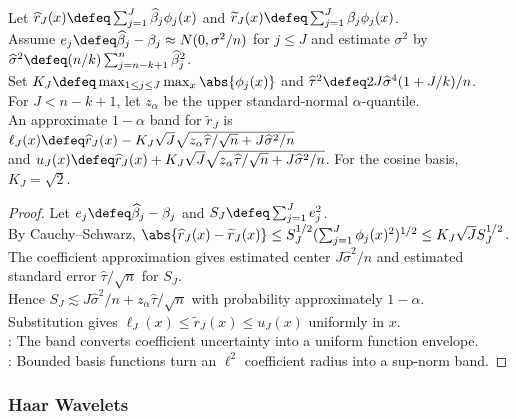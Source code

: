 \begin{theorem} \label{thm:orthogonal-regression-confidence-band} \\
Let $\widehat r_J(x)\defeq\sum_{j=1}^{J}\widehat\beta_j\phi_j(x)$ and $\widetilde r_J(x)\defeq\sum_{j=1}^{J}\beta_j\phi_j(x)$.\\
Assume $e_j\defeq\widehat\beta_j-\beta_j\approx N(0,\sigma^2/n)$ for $j\leq J$ and estimate $\sigma^2$ by $\widehat\sigma^2\defeq(n/k)\sum_{j=n-k+1}^{n}\widehat\beta_j^2$.\\
Set $K_J\defeq\max_{1\leq j\leq J}\max_x\abs{\phi_j(x)}$ and $\widehat\tau^2\defeq 2J\widehat\sigma^4(1+J/k)/n$.\\
For $J<n-k+1$, let $z_\alpha$ be the upper standard-normal $\alpha$-quantile.\\
An approximate $1-\alpha$ band for $\widetilde r_J$ is $\ell_J(x)\defeq\widehat r_J(x)-K_J\sqrt J\sqrt{z_\alpha\widehat\tau/\sqrt n+J\widehat\sigma^2/n}$\\
and $u_J(x)\defeq\widehat r_J(x)+K_J\sqrt J\sqrt{z_\alpha\widehat\tau/\sqrt n+J\widehat\sigma^2/n}$. For the cosine basis, $K_J=\sqrt2$.
\begin{proof} Let $e_j\defeq\widehat\beta_j-\beta_j$ and $S_J\defeq\sum_{j=1}^{J}e_j^2$.\\
By Cauchy--Schwarz, $\abs{\widehat r_J(x)-\widetilde r_J(x)}\leq S_J^{1/2}(\sum_{j=1}^{J}\phi_j(x)^2)^{1/2}\leq K_J\sqrt J S_J^{1/2}$.\\
The coefficient approximation gives estimated center $J\widehat\sigma^2/n$ and estimated standard error $\widehat\tau/\sqrt n$ for $S_J$.\\
Hence $S_J\lesssim J\widehat\sigma^2/n+z_\alpha\widehat\tau/\sqrt n$ with probability approximately $1-\alpha$.\\
Substitution gives $\ell_J(x)\leq\widetilde r_J(x)\leq u_J(x)$ uniformly in $x$.\\
: The band converts coefficient uncertainty into a uniform function envelope.\\
: Bounded basis functions turn an $\ell^2$ coefficient radius into a sup-norm band.
\end{proof}
\end{theorem}

\subsubsection{Haar Wavelets}

